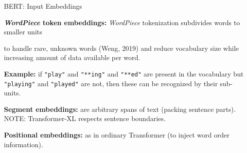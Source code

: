 \begin{frame}{BERT: Input Embeddings}
    
    \begin{itemizeSpaced}{10pt}
        \footnotesize 
        
        \pinkbox  \textbf{\textit{WordPiece} token embeddings: } \emph{WordPiece} tokenization subdivides words to smaller units 
        
        \vspace{7pt}
        \begin{itemizeSpaced}{7pt}
        
            \footnotesize
            \item to handle rare, unknown words (Weng, 2019) and reduce vocabulary size while increasing amount of data available per word.
            
            \pinkbox \textbf{Example: }if \texttt{"play"} and \texttt{"**ing"} and \texttt{"**ed"} are present in the vocabulary but \texttt{"playing"} and \texttt{"played"} are not, then these can be recognized by their sub-units. 
        \end{itemizeSpaced}
        
        
        \item \textbf{Segment embeddings: } are arbitrary spans of text (packing sentence parts). 
        NOTE: Transformer-XL respects sentence boundaries. 
        
        \item \textbf{Positional embeddings: } as in ordinary Transformer (to inject word order information). 
    
    \end{itemizeSpaced}
    
\end{frame}




